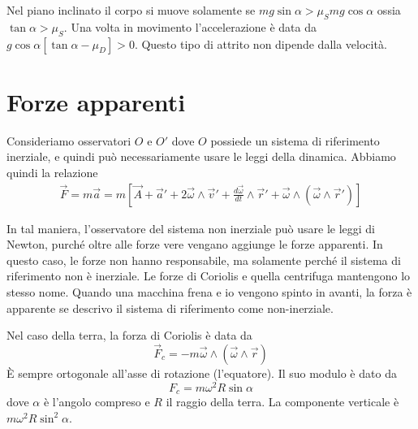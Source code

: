 \documentclass[a4paper]{article}
\begin{document}
Nel piano inclinato il corpo si muove solamente se \(mg\sin\alpha > \mu_S mg\cos\alpha\)
ossia \(\tan \alpha > \mu_S\).
Una volta in movimento l'accelerazione è data da \(g\cos\alpha\left[\tan\alpha-\mu_D\right]>0\).
Questo tipo di attrito non dipende dalla velocità.

\pagebreak

\section{Forze apparenti}

Consideriamo osservatori \(O\) e \(O'\) dove \(O\)
possiede un sistema di riferimento inerziale, e quindi può necessariamente
usare le leggi della dinamica. Abbiamo quindi la relazione
\begin{align*}
    \vec{F} = m\vec{a} = m \left[\vec{A} + \vec{a}' + 2 \vec{\omega} \wedge \vec{v}' + \frac{d\vec{\omega}}{dt} \wedge \vec{r}'
    + \vec{\omega} \wedge (\vec{\omega} \wedge \vec{r}') \right]
\end{align*}


In tal maniera, l'osservatore del sistema non inerziale può usare le leggi di Newton,
purché oltre alle forze vere vengano aggiunge le forze apparenti.
In questo caso, le forze non hanno responsabile, ma solamente perché il sistema di riferimento
non è inerziale.
Le forze di Coriolis e quella centrifuga mantengono lo stesso nome.
Quando una macchina frena e io vengono spinto in avanti, la forza è apparente
se descrivo il sistema di riferimento come non-inerziale.

Nel caso della terra, la forza di Coriolis è data da
\[
    \vec{F}_c = -m\vec{\omega} \wedge (\vec{\omega} \wedge \vec{r})
\]
È sempre ortogonale all'asse di rotazione (l'equatore).
Il suo modulo è dato da
\[
    F_c = m\omega^2 R \sin\alpha
\]
dove \(\alpha\) è l'angolo compreso e \(R\) il raggio della terra.
La componente verticale è \(m \omega^2 R \sin^2\alpha\).

\end{document}
